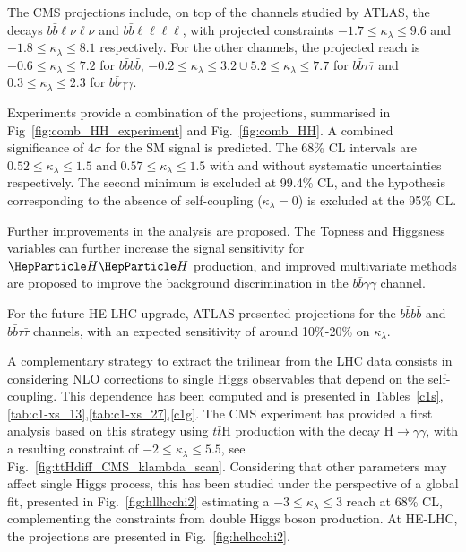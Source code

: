 \documentclass[../report.tex]{subfiles}
\begin{document}
The CMS projections include, on top of the channels studied by ATLAS, the decays $b\bar{b}\ell\nu\ell\nu$ and $b\bar{b}\ell\ell\ell\ell$, with projected constraints $-1.7\leq \kappa_\lambda \leq 9.6$ and $-1.8\leq \kappa_\lambda \leq 8.1$ respectively. For the other channels, the projected reach is $-0.6\leq \kappa_\lambda \leq 7.2$ for $b\bar{b}b\bar{b}$, $-0.2\leq \kappa_\lambda \leq 3.2 \cup 5.2\leq \kappa_\lambda \leq 7.7$ for  $b\bar{b}\tau\bar{\tau}$ and $0.3\leq \kappa_\lambda \leq 2.3$ for $b\bar{b}\gamma\gamma$.

Experiments provide a combination of the projections, summarised in Fig~\ref{fig:comb_HH_experiment} and Fig.~\ref{fig:comb_HH}. A combined significance of $4\sigma$ for the SM \HH signal is predicted.
The 68\% CL intervals are $0.52\leq \kappa_\lambda \leq 1.5$ and $0.57\leq \kappa_\lambda \leq 1.5$ with and without systematic uncertainties respectively. The second minimum is excluded at 99.4\% CL, and the hypothesis corresponding to the absence of self-coupling  ($\kappa_\lambda=0$) is excluded at the 95\% CL.

Further improvements in the analysis are proposed. The Topness and Higgsness variables can further increase the signal sensitivity for $\HH$ production, and improved multivariate methods are proposed to improve the background discrimination in the $b\bar{b}\gamma\gamma$ channel.

For the future HE-LHC upgrade, ATLAS presented projections for the $b\bar{b}b\bar{b}$ and $b\bar{b}\tau\bar{\tau}$ channels, with an expected sensitivity of around 10\%-20\% on $\kappa_\lambda$.

A complementary strategy to extract the trilinear from the LHC data consists in considering NLO corrections to single Higgs observables that depend on the self-coupling. This dependence has been computed and is presented in Tables~\ref{c1s},\ref{tab:c1-xs_13},\ref{tab:c1-xs_27},\ref{c1g}. The CMS experiment has provided a first analysis based on this strategy using $t\bar{t}\text{H}$ production with the decay $\text{H}\to \gamma\gamma$, with a resulting constraint of $-2\leq \kappa_\lambda\leq 5.5$, see Fig.~\ref{fig:ttHdiff_CMS_klambda_scan}. Considering that other parameters may affect single Higgs process, this has been studied under the perspective of a global fit, presented in Fig.~\ref{fig:hllhcchi2} estimating a $-3\leq \kappa_\lambda \leq 3$ reach at 68\% CL, complementing the constraints from double Higgs boson production. At HE-LHC, the projections are presented in Fig.~\ref{fig:helhcchi2}.
\end{document}
